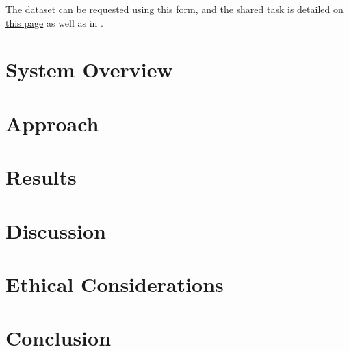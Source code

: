 \documentclass[11pt,a4paper]{article}
\begin{document}
The dataset can be requested using \href{http://hatespeech.di.unito.it/hateval.html}{this form}, and the shared task is detailed on \href{https://competitions.codalab.org/competitions/19935#learn_the_details-overview}{this page} as well as in \citet{basile-etal-2019-semeval}.



\section{System Overview}
\lipsum[1-1]

\section{Approach}
\lipsum[1-1]

\section{Results}
\lipsum[1-1]

\section{Discussion}
\lipsum[1-1]

\section{Ethical Considerations}
\lipsum[1-1]

\section{Conclusion}
\lipsum[1-1]

\nocite{*}


\end{document}

